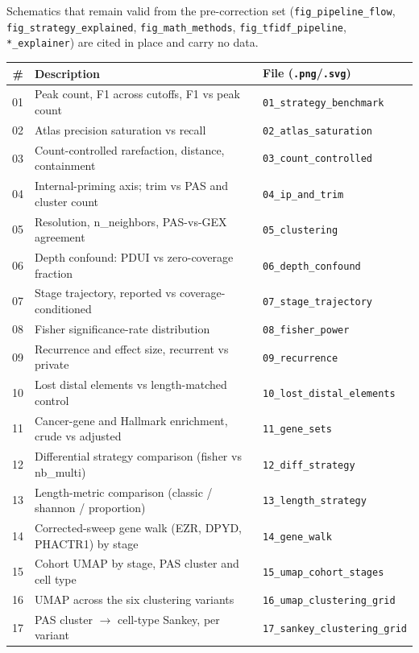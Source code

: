 \documentclass[11pt,a4paper]{article}
\begin{document}
Schematics that remain valid from the pre-correction set
(\texttt{fig\_pipeline\_flow}, \texttt{fig\_strategy\_explained},
\texttt{fig\_math\_methods}, \texttt{fig\_tfidf\_pipeline},
\texttt{*\_explainer}) are cited in place and carry no data.

\begin{longtable}{rll}
  \toprule
  \textbf{\#} & \textbf{Description} & \textbf{File (\texttt{.png}/\texttt{.svg})} \\
  \midrule
  \endhead
  01 & Peak count, F1 across cutoffs, F1 vs peak count & \texttt{01\_strategy\_benchmark} \\
  02 & Atlas precision saturation vs recall & \texttt{02\_atlas\_saturation} \\
  03 & Count-controlled rarefaction, distance, containment & \texttt{03\_count\_controlled} \\
  04 & Internal-priming axis; trim vs PAS and cluster count & \texttt{04\_ip\_and\_trim} \\
  05 & Resolution, n\_neighbors, PAS-vs-GEX agreement & \texttt{05\_clustering} \\
  06 & Depth confound: PDUI vs zero-coverage fraction & \texttt{06\_depth\_confound} \\
  07 & Stage trajectory, reported vs coverage-conditioned & \texttt{07\_stage\_trajectory} \\
  08 & Fisher significance-rate distribution & \texttt{08\_fisher\_power} \\
  09 & Recurrence and effect size, recurrent vs private & \texttt{09\_recurrence} \\
  10 & Lost distal elements vs length-matched control & \texttt{10\_lost\_distal\_elements} \\
  11 & Cancer-gene and Hallmark enrichment, crude vs adjusted & \texttt{11\_gene\_sets} \\
  12 & Differential strategy comparison (fisher vs nb\_multi) & \texttt{12\_diff\_strategy} \\
  13 & Length-metric comparison (classic / shannon / proportion) & \texttt{13\_length\_strategy} \\
  14 & Corrected-sweep gene walk (EZR, DPYD, PHACTR1) by stage & \texttt{14\_gene\_walk} \\
  15 & Cohort UMAP by stage, PAS cluster and cell type & \texttt{15\_umap\_cohort\_stages} \\
  16 & UMAP across the six clustering variants & \texttt{16\_umap\_clustering\_grid} \\
  17 & PAS cluster $\rightarrow$ cell-type Sankey, per variant & \texttt{17\_sankey\_clustering\_grid} \\

\end{longtable}
\end{document}
